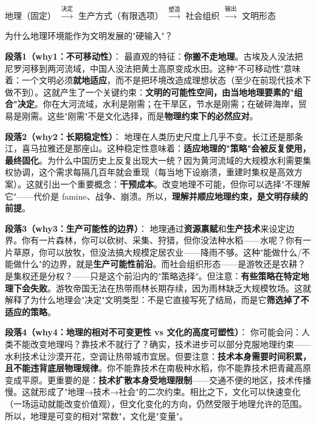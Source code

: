 \documentclass[../main.tex]{subfiles}
\begin{document}
	\begin{logicmap}
		地理（固定） $\xrightarrow{\text{决定}}$ 生产方式（有限选项） $\xrightarrow{\text{塑造}}$ 社会组织 $\xrightarrow{\text{输出}}$ 文明形态
	\end{logicmap}
	
	\begin{questionbox}
		为什么地理环境能作为文明发展的"硬输入"？
	\end{questionbox}
	
	\textbf{段落1（why1：不可移动性）}：  
	最直观的特征：\textbf{你搬不走地理}。古埃及人没法把尼罗河移到两河流域，中国人没法把黄土高原变成水田。这种"不可移动性"意味着：一个文明必须\textbf{就地适应}，而不是把环境改造成理想状态（至少在前现代技术下做不到）。这就产生了一个关键约束：\textbf{文明的可能性空间，由当地地理要素的"组合"决定}。你在大河流域，水利是刚需；在干旱区，节水是刚需；在破碎海岸，贸易是刚需。这些"刚需"不是文化选择，而是\textbf{物理约束下的必然应对}。
	
	\textbf{段落2（why2：长期稳定性）}：  
	地理在人类历史尺度上几乎不变。长江还是那条江，喜马拉雅还是那座山。这种稳定性意味着：\textbf{适应地理的"策略"会被反复使用，最终固化}。为什么中国历史上反复出现大一统？因为黄河流域的大规模水利需要集权协调，这个需求每隔几百年就会重现（每当地下设崩溃，重建时集权是高效方案）。这就引出一个重要概念：\textbf{干预成本}。改变地理不可能，但你可以选择"不理解它"——代价是 famine、战争、崩溃。所以，\textbf{理解并顺应地理约束，是文明存续的前提}。
	
	\textbf{段落3（why3：生产可能性的边界）}：  
	地理通过\textbf{资源禀赋}和\textbf{生产技术}来设定边界。你有一片森林，你可以砍树、采集、狩猎，但你没法种水稻——水呢？你有一片草原，你可以放牧，但没法搞大规模定居农业——降雨不够。这种"能做什么/不能做什么"的边界，就是\textbf{生产可能性前沿}。而社会组织形态——是游牧还是农耕？是集权还是分权？——只是这个前沿内的"策略选择"。但注意：\textbf{有些策略在特定地理下会失败}。游牧帝国无法在热带雨林长期存续，因为雨林缺乏大规模牧场。这就解释了为什么地理会"决定"文明类型：不是它直接写死了结局，而是它\textbf{筛选掉了不适应的策略}。
	
	\textbf{段落4（why4：地理的相对不可变更性 vs 文化的高度可塑性）}：  
	你可能会问：人类不能改变地理吗？靠技术不就行了？确实，技术进步可以部分克服地理约束——水利技术让沙漠开花，空调让热带城市宜居。但要注意：\textbf{技术本身需要时间积累，且不能违背底层物理规律}。你不能靠技术在南极种水稻，你不能靠技术把青藏高原变成平原。更重要的是：\textbf{技术扩散本身受地理限制}——交通不便的地区，技术传播慢。这就形成了"地理→技术→社会"的二次约束。相比之下，文化可以快速变化（一场运动就能改变价值观），但文化变化的方向，仍然受限于地理允许的范围。所以，地理是可变的相对"常数"，文化是"变量"。
	
\end{document}

